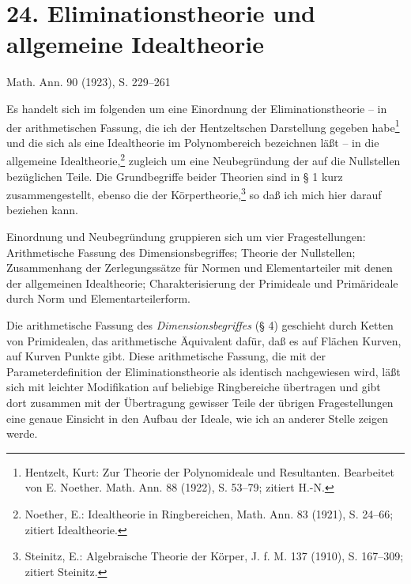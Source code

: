 \documentclass[11pt]{article}
\begin{document}
\setcounter{footnote}{0}

\section*{24. Eliminationstheorie und allgemeine Idealtheorie}
\begin{center}
Math. Ann. 90 (1923), S. 229--261
\end{center}

Es handelt sich im folgenden um eine Einordnung der Eliminationstheorie -- in der arithmetischen Fassung, die ich der Hentzeltschen Darstellung gegeben habe\footnote{Hentzelt, Kurt: Zur Theorie der Polynomideale und Resultanten. Bearbeitet von E. Noether. Math. Ann. 88 (1922), S. 53--79; zitiert H.-N.} und die sich als eine Idealtheorie im Polynombereich bezeichnen läßt -- in die allgemeine Idealtheorie,\footnote{Noether, E.: Idealtheorie in Ringbereichen, Math. Ann. 83 (1921), S. 24--66; zitiert Idealtheorie.} zugleich um eine Neubegründung der auf die Nullstellen bezüglichen Teile. Die Grundbegriffe beider Theorien sind in § 1 kurz zusammengestellt, ebenso die der Körpertheorie,\footnote{Steinitz, E.: Algebraische Theorie der Körper, J. f. M. 137 (1910), S. 167--309; zitiert Steinitz.} so daß ich mich hier darauf beziehen kann.

Einordnung und Neubegründung gruppieren sich um vier Fragestellungen: Arithmetische Fassung des Dimensionsbegriffes; Theorie der Nullstellen; Zusammenhang der Zerlegungssätze für Normen und Elementarteiler mit denen der allgemeinen Idealtheorie; Charakterisierung der Primideale und Primärideale durch Norm und Elementarteilerform.

Die arithmetische Fassung des \emph{Dimensionsbegriffes} (§ 4) geschieht durch Ketten von Primidealen, das arithmetische Äquivalent dafür, daß es auf Flächen Kurven, auf Kurven Punkte gibt. Diese arithmetische Fassung, die mit der Parameterdefinition der Eliminationstheorie als identisch nachgewiesen wird, läßt sich mit leichter Modifikation auf beliebige Ringbereiche übertragen und gibt dort zusammen mit der Übertragung gewisser Teile der übrigen Fragestellungen eine genaue Einsicht in den Aufbau der Ideale, wie ich an anderer Stelle zeigen werde.
\end{document}
